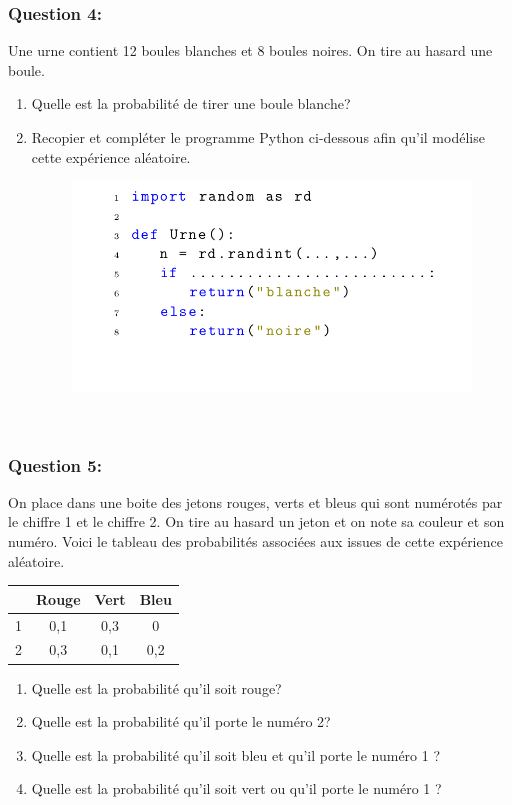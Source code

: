 \documentclass[t,12pt]{beamer}
\begin{document}
\begin{frame}
	\frametitle{Question 4: }
			Une urne contient 12 boules blanches et 8 boules noires. On tire au hasard une boule.
	\begin{enumerate}
		\item Quelle est la probabilité de tirer une boule blanche?
		\item Recopier et compléter le programme Python ci-dessous afin qu'il modélise cette expérience aléatoire. 
		\begin{figure}
			\includegraphics[scale=0.4]{2.png}
		\end{figure}\hfill\\
	\end{enumerate}
\end{frame}


\begin{frame}
	\frametitle{Question 5: }
	On place dans une boite des jetons rouges, verts et bleus qui sont numérotés par le chiffre 1 et le chiffre 2. On tire au hasard un jeton et on note sa couleur et son numéro. Voici le tableau des probabilités associées aux issues de cette expérience aléatoire. 
	
	\begin{center}
		\begin{tabular}{|l|c|c|c|}
			\cline{2-4}
			\multicolumn{1}{c|}{} & Rouge & Vert & Bleu  \\
			\hline
			1  &  0,1 &  0,3& 0\\ \hline
			2 & 0,3 & 0,1& 0,2\\
			\hline 
		\end{tabular}
	\end{center} 
	\begin{enumerate}
		\item Quelle est la probabilité qu'il soit rouge?
		\item Quelle est la probabilité qu'il porte le numéro 2?
		\item Quelle est la probabilité qu'il soit bleu et qu'il porte le numéro 1 ? 
		\item Quelle est la probabilité qu'il soit vert ou qu'il porte le numéro 1 ?
	\end{enumerate}
\end{frame}
\end{document}
